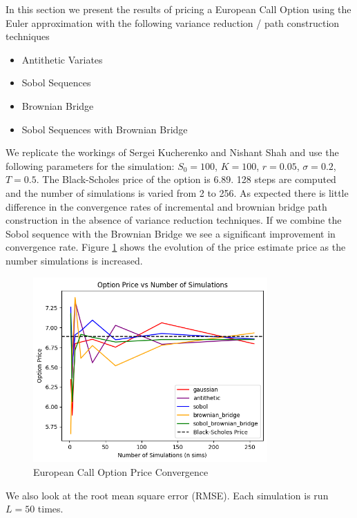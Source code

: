 \documentclass{article}
\newcommand{\para}{\vspace{8pt}} %
\begin{document}
In this section we present the results of pricing a European Call Option using the Euler approximation with the following variance reduction / path construction techniques

\begin{itemize}
    \item Antithetic Variates
    \item Sobol Sequences
    \item Brownian Bridge
    \item Sobol Sequences with Brownian Bridge
\end{itemize}

We replicate the workings of Sergei Kucherenko and Nishant Shah \cite{sergei} and use
the following parameters for the simulation: $S_0 = 100$, $K = 100$, $r = 0.05$, $\sigma = 0.2$, $T = 0.5$.
The Black-Scholes price of the option is 6.89.  128 steps are computed and the number of simulations
is varied from 2 to 256.  As expected there is little difference in the convergence rates of incremental and brownian bridge path 
construction in the absence of variance reduction techniques. If we combine the Sobol sequence with the Brownian Bridge we see 
a significant improvement in convergence rate. Figure \ref{fig:option_price} shows the evolution of the price estimate price as the number
simulations is increased.

\begin{figure}[h]
    \centering
    \includegraphics[width=0.8\textwidth]{images/option_price.png}
    \caption{European Call Option Price Convergence}
    \label{fig:option_price}
\end{figure}

\para
We also look at the root mean square error (RMSE). Each simulation is run $L=50$ times.
\end{document}
